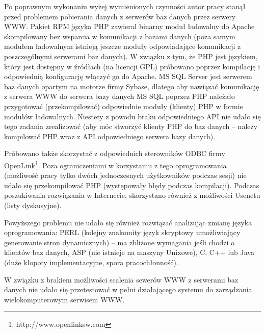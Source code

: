 Po poprawnym wykonaniu wyżej wymienionych czynności autor pracy stanął przed problemem pobierania danych z serwerów baz danych
przez serwery WWW. Pakiet RPM języka PHP zawierał binarny moduł ładowalny do Apache skompilowany bez wsparcia w komunikacji
z bazami danych (poza samym modułem ładowalnym istnieją jeszcze moduły odpowiadające komunikacji z poszczególnymi serwerami
baz danych). W związku z tym, że PHP jest językiem, który jest dostępny w źródłach (na licencji GPL) próbowano poprzez 
kompilację i odpowiednią konfigurację włączyć go do Apache. MS SQL Server jest serwerem baz danych opartym na motorze firmy 
Sybase, dlatego aby nawiązać komunikację z serwera WWW do serwera bazy danych MS SQL poprzez PHP należało przygotować 
(przekompilować) odpowiednie moduły (klienty) PHP w formie modułów ładowalnych. Niestety z powodu braku odpowiedniego API
nie udało się tego zadania zrealizować (aby móc stworzyć klienty PHP do baz danych -- należy kompilować PHP wraz z API
odpowiedniego serwera bazy danych).

Próbowano także skorzystać z odpowiednich sterowników ODBC firmy OpenLink\footnote{http://www.openlinksw.com}. Poza 
ograniczeniami w korzystaniu z tego oprogramowania (możliwość pracy tylko dwóch jednoczesnych użytkowników podczas sesji) nie
udało się przekompilować PHP (występowały błędy podczas kompilacji). Podczas poszukiwania rozwiązania w Internecie, skorzystano
również z możliwości Usenetu (listy dyskusyjne).

Powyższego problemu nie udało się również rozwiązać analizując zmianę języka oprogramowania: PERL (kolejny znakomity język 
skryptowy umożliwiający generowanie stron dynamicznych) -- ma zbliżone wymagania jeśli chodzi o klientów baz danych, ASP (nie 
istnieje na maszyny Unixowe), C, C++ lub Java (duże kłopoty implementacyjne, spora pracochłonność).

W związku z brakiem możliwości scalenia sewerów WWW z serwerami baz danych nie udało się przetestować w pełni działającego
systemu do zarządzania wielokomputerowym serwisem WWW.

